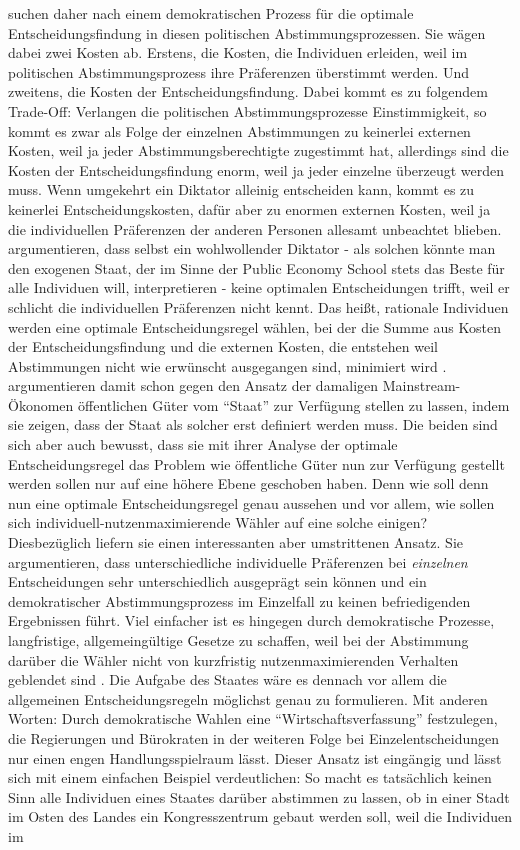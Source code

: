 \textcite{Buchanan1962} suchen daher nach einem demokratischen Prozess für die optimale Entscheidungsfindung in diesen politischen Abstimmungsprozessen. Sie wägen dabei zwei Kosten ab. Erstens, die Kosten, die Individuen erleiden, weil im politischen Abstimmungsprozess ihre Präferenzen überstimmt werden. Und zweitens, die Kosten der Entscheidungsfindung. Dabei kommt es zu folgendem Trade-Off: Verlangen die politischen Abstimmungsprozesse Einstimmigkeit, so kommt es zwar als Folge der einzelnen Abstimmungen zu keinerlei externen Kosten, weil ja jeder Abstimmungsberechtigte zugestimmt hat, allerdings sind die Kosten der Entscheidungsfindung enorm, weil ja jeder einzelne überzeugt werden muss. Wenn umgekehrt ein Diktator alleinig entscheiden kann, kommt es zu keinerlei Entscheidungskosten, dafür aber zu enormen externen Kosten, weil ja die individuellen Präferenzen der anderen Personen allesamt unbeachtet blieben. \textcite{Buchanan1962} argumentieren, dass selbst ein wohlwollender Diktator - als solchen könnte man den exogenen Staat, der im Sinne der Public Economy School stets das Beste für alle Individuen will, interpretieren - keine optimalen Entscheidungen trifft, weil er schlicht die individuellen Präferenzen nicht kennt. Das heißt, rationale Individuen werden eine optimale Entscheidungsregel wählen, bei der die Summe aus Kosten der Entscheidungsfindung und die externen Kosten, die entstehen weil Abstimmungen nicht wie erwünscht ausgegangen sind, minimiert wird \parencite[S. 71]{Buchanan1962}. \textcite{Buchanan1962} argumentieren damit schon gegen den Ansatz der damaligen Mainstream-Ökonomen öffentlichen Güter vom "`Staat"' zur Verfügung stellen zu lassen, indem sie zeigen, dass der Staat als solcher erst definiert werden muss. Die beiden sind sich aber auch bewusst, dass sie mit ihrer Analyse der optimale Entscheidungsregel das Problem wie öffentliche Güter nun zur Verfügung gestellt werden sollen nur auf eine höhere Ebene geschoben haben. Denn wie soll denn nun eine optimale Entscheidungsregel genau aussehen und vor allem, wie sollen sich individuell-nutzenmaximierende Wähler auf eine solche einigen? Diesbezüglich liefern sie einen interessanten aber umstrittenen Ansatz. Sie argumentieren, dass unterschiedliche individuelle Präferenzen bei \textit{einzelnen} Entscheidungen sehr unterschiedlich ausgeprägt sein können und ein demokratischer Abstimmungsprozess im Einzelfall zu keinen befriedigenden Ergebnissen führt. Viel einfacher ist es hingegen durch demokratische Prozesse, langfristige, allgemeingültige Gesetze zu schaffen, weil bei der Abstimmung darüber die Wähler nicht von kurzfristig nutzenmaximierenden Verhalten geblendet sind \parencite[S. 78]{Buchanan1962}. Die Aufgabe des Staates wäre es dennach vor allem die allgemeinen Entscheidungsregeln möglichst genau zu formulieren. Mit anderen Worten: Durch demokratische Wahlen eine "`Wirtschaftsverfassung"' festzulegen, die Regierungen und Bürokraten in der weiteren Folge bei Einzelentscheidungen nur einen engen Handlungsspielraum lässt. Dieser Ansatz ist eingängig und lässt sich mit einem einfachen Beispiel verdeutlichen: So macht es tatsächlich keinen Sinn alle Individuen eines Staates darüber abstimmen zu lassen, ob in einer Stadt im Osten des Landes ein Kongresszentrum gebaut werden soll, weil die Individuen im 
